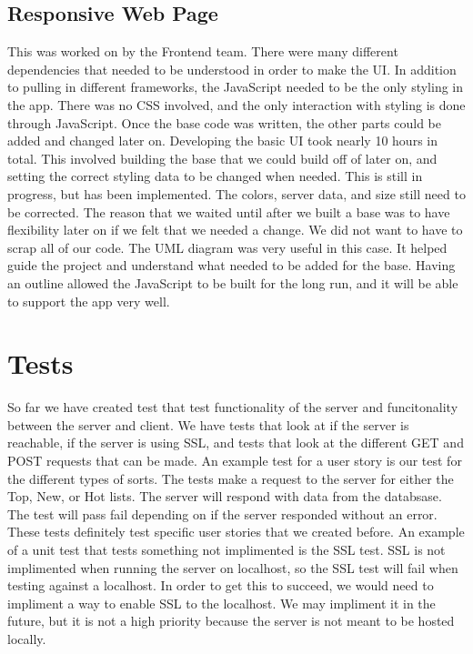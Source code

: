 \documentclass[12pt]{article}
\begin{document}
      \subsection{Responsive Web Page}
      This was worked on by the Frontend team. There were many different dependencies that needed to be understood in order to make the UI. In addition to pulling in different frameworks, the JavaScript needed to be the only styling in the app. There was no CSS involved, and the only interaction with styling is done through JavaScript. Once the base code was written, the other parts could be added and changed later on. Developing the basic UI took nearly 10 hours in total. This involved building the base that we could build off of later on, and setting the correct styling data to be changed when needed. This is still in progress, but has been implemented. The colors, server data, and size still need to be corrected. The reason that we waited until after we built a base was to have flexibility later on if we felt that we needed a change. We did not want to have to scrap all of our code. The UML diagram was very useful in this case. It helped guide the project and understand what needed to be added for the base. Having an outline allowed the JavaScript to be built for the long run, and it will be able to support the app very well.
      
\section{Tests}

So far we have created test that test functionality of the server and funcitonality between the server and client.  We have tests that look at if the server is reachable, if the server is using SSL, and tests that look at the different GET and POST requests that can be made.  An example test for a user story is our test for the different types of sorts.  The tests make a request to the server for either the Top, New, or Hot lists.  The server will respond with data from the databsase.  The test will pass fail depending on if the server responded without an error.  These tests definitely test specific user stories that we created before.  An example of a unit test that tests something not implimented is the SSL test.  SSL is not implimented when running the server on localhost, so the SSL test will fail when testing against a localhost.  In order to get this to succeed, we would need to impliment a way to enable SSL to the localhost.  We may impliment it in the future, but it is not a high priority because the server is not meant to be hosted locally.  
\end{document}
